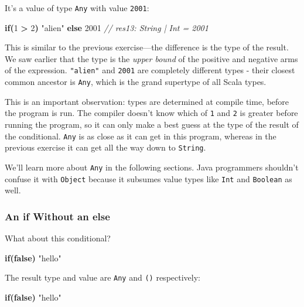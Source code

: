 \documentclass[11pt,a5paper,]{book}
\newenvironment{Shaded}{\begin{snugshade}}{\end{snugshade}}
\newcommand{\CommentTok}[1]{\textcolor[rgb]{0.56,0.35,0.01}{\textit{#1}}}
\newcommand{\ControlFlowTok}[1]{\textcolor[rgb]{0.13,0.29,0.53}{\textbf{#1}}}
\newcommand{\DecValTok}[1]{\textcolor[rgb]{0.00,0.00,0.81}{#1}}
\newcommand{\KeywordTok}[1]{\textcolor[rgb]{0.13,0.29,0.53}{\textbf{#1}}}
\newcommand{\OperatorTok}[1]{\textcolor[rgb]{0.81,0.36,0.00}{\textbf{#1}}}
\newcommand{\StringTok}[1]{\textcolor[rgb]{0.31,0.60,0.02}{#1}}
\begin{document}
It's a value of type \texttt{Any} with value \texttt{2001}:

\begin{Shaded}
\begin{Highlighting}[]
\ControlFlowTok{if}\OperatorTok{(}\DecValTok{1} \OperatorTok{\textgreater{}} \DecValTok{2}\OperatorTok{)} \StringTok{"alien"} \ControlFlowTok{else} \DecValTok{2001}
\CommentTok{// res13: String | Int = 2001}
\end{Highlighting}
\end{Shaded}

This is similar to the previous exercise---the difference is the type of
the result. We saw earlier that the type is the \emph{upper bound} of
the positive and negative arms of the expression. \texttt{"alien"} and
\texttt{2001} are completely different types - their closest common
ancestor is \texttt{Any}, which is the grand supertype of all Scala
types.

This is an important observation: types are determined at compile time,
before the program is run. The compiler doesn't know which of \texttt{1}
and \texttt{2} is greater before running the program, so it can only
make a best guess at the type of the result of the conditional.
\texttt{Any} is as close as it can get in this program, whereas in the
previous exercise it can get all the way down to \texttt{String}.

We'll learn more about \texttt{Any} in the following sections. Java
programmers shouldn't confuse it with \texttt{Object} because it
subsumes value types like \texttt{Int} and \texttt{Boolean} as well.

\hypertarget{an-if-without-an-else}{%
\subsubsection{An if Without an else}\label{an-if-without-an-else}}

What about this conditional?

\begin{Shaded}
\begin{Highlighting}[]
\ControlFlowTok{if}\OperatorTok{(}\KeywordTok{false}\OperatorTok{)} \StringTok{"hello"}
\end{Highlighting}
\end{Shaded}

The result type and value are \texttt{Any} and \texttt{()} respectively:

\begin{Shaded}
\begin{Highlighting}[]
\ControlFlowTok{if}\OperatorTok{(}\KeywordTok{false}\OperatorTok{)} \StringTok{"hello"}
\end{Highlighting}
\end{Shaded}
\end{document}
